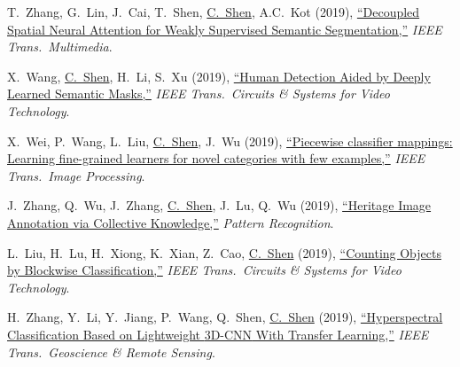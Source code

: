 \documentclass[9pt, a4paper]{article}
\newcommand{\years}[1]{\marginnote{\scriptsize #1}}
\def\highlight{\uline}
\begin{document}
\medskip

\years{2019} T.~Zhang, G.~Lin, J.~Cai, T.~Shen, \highlight{C.~Shen}, A.C.~Kot (2019),
\href{http://www.google.com/search?lr=&ie=UTF-8&oe=UTF-8&q=Decoupled+Spatial+Neural+Attention+for+Weakly+Supervised+Semantic+Segmentation+Tianyi+Zhang%2C+Guosheng+Lin%2C+Jianfei+Cai%2C+Tong+Shen%2C+Chunhua+Shen%2C+Alex+C.+Kot}{``Decoupled Spatial Neural Attention for Weakly Supervised Semantic Segmentation,{}''}
\emph{IEEE Trans.\  Multimedia}.

\medskip

\years{2019} X.~Wang, \highlight{C.~Shen}, H.~Li, S.~Xu (2019),
\href{http://www.google.com/search?lr=&ie=UTF-8&oe=UTF-8&q=Human+Detection+Aided+by+Deeply+Learned+Semantic+Masks+Xinyu+Wang%2C+Chunhua+Shen%2C+Hanxi+Li%2C+Shugong+Xu}{``Human Detection Aided by Deeply Learned Semantic Masks,{}''}
\emph{IEEE Trans.\  Circuits \& Systems for Video Technology}.

\medskip

\years{2019} X.~Wei, P.~Wang, L.~Liu, \highlight{C.~Shen}, J.~Wu (2019),
\href{http://www.google.com/search?lr=&ie=UTF-8&oe=UTF-8&q=Piecewise+classifier+mappings%3A+Learning+fine-grained+learners+for+novel+categories+with+few+examples+Xiu-Shen+Wei%2C+Peng+Wang%2C+Lingqiao+Liu%2C+Chunhua+Shen%2C+Jianxin+Wu}{``Piecewise classifier mappings: Learning fine-grained learners for novel categories with few examples,{}''}
\emph{IEEE Trans.\  Image Processing}.

\medskip

\years{2019} J.~Zhang, Q.~Wu, J.~Zhang, \highlight{C.~Shen}, J.~Lu, Q.~Wu (2019),
\href{http://www.google.com/search?lr=&ie=UTF-8&oe=UTF-8&q=Heritage+Image+Annotation+via+Collective+Knowledge+Junjie+Zhang%2C+Qi+Wu%2C+Jian+Zhang%2C+Chunhua+Shen%2C+Jianfeng+Lu%2C+Qiang+Wu}{``Heritage Image Annotation via Collective Knowledge,{}''}
\emph{Pattern Recognition}.

\medskip

\years{2019} L.~Liu, H.~Lu, H.~Xiong, K.~Xian, Z.~Cao, \highlight{C.~Shen} (2019),
\href{http://www.google.com/search?lr=&ie=UTF-8&oe=UTF-8&q=Counting+Objects+by+Blockwise+Classification+Liang+Liu%2C+Hao+Lu%2C+Haipeng+Xiong%2C+Ke+Xian%2C+Zhiguo+Cao%2C+Chunhua+Shen}{``Counting Objects by Blockwise Classification,{}''}
\emph{IEEE Trans.\  Circuits \& Systems for Video Technology}.

\medskip

\years{2019} H.~Zhang, Y.~Li, Y.~Jiang, P.~Wang, Q.~Shen, \highlight{C.~Shen} (2019),
\href{http://www.google.com/search?lr=&ie=UTF-8&oe=UTF-8&q=Hyperspectral+Classification+Based+on+Lightweight+3D-CNN+With+Transfer+Learning+Haokui+Zhang%2C+Ying+Li%2C+Yenan+Jiang%2C+Peng+Wang%2C+Qiang+Shen%2C+Chunhua+Shen}{``Hyperspectral Classification Based on Lightweight {3D-CNN} With Transfer Learning,{}''}
\emph{IEEE Trans.\  Geoscience \& Remote Sensing}.
\end{document}
